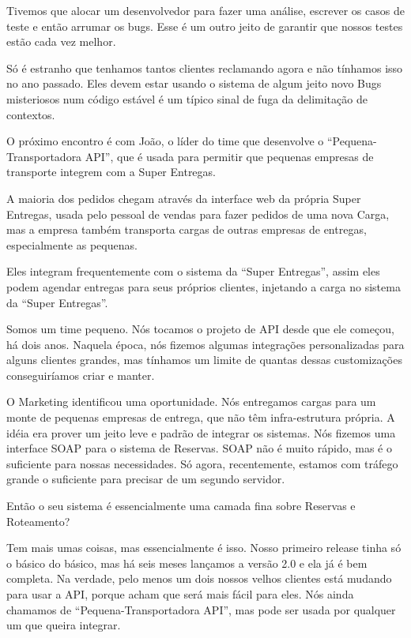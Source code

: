\documentclass[12pt,play]{article}
\begin{document}
Tivemos que alocar um desenvolvedor para fazer uma análise, escrever os casos de teste e então arrumar os bugs. Esse é um outro jeito de garantir que nossos testes estão cada vez melhor.

Só é estranho que tenhamos tantos clientes reclamando agora e não tínhamos isso no ano passado. Eles devem estar usando o sistema de algum jeito novo
\narr Bugs misteriosos num código estável é um típico sinal de fuga da delimitação de contextos.

\scene
\narr O próximo encontro é com João, o líder do time que desenvolve o ``Pequena-Transportadora API'', que é usada para permitir que pequenas empresas de transporte integrem com a Super Entregas.

A maioria dos pedidos chegam através da interface web da própria Super Entregas, usada pelo pessoal de vendas para fazer pedidos de uma nova Carga, mas a empresa também transporta cargas de outras empresas de entregas, especialmente as pequenas.

Eles integram frequentemente com o sistema da ``Super Entregas'', assim eles podem agendar entregas para seus próprios clientes, injetando a carga no sistema da ``Super Entregas''.

\joao Somos um time pequeno. Nós tocamos o projeto de API desde que ele começou, há dois anos. Naquela época, nós fizemos algumas integrações personalizadas para alguns clientes grandes, mas tínhamos um limite de quantas dessas customizações conseguiríamos criar e manter.

O Marketing identificou uma oportunidade. Nós entregamos cargas para um monte de pequenas empresas de entrega, que não têm infra-estrutura própria. A idéia era prover um jeito leve e padrão de integrar os sistemas. Nós fizemos uma interface SOAP para o sistema de Reservas. SOAP não é muito rápido, mas é o suficiente para nossas necessidades. Só agora, recentemente, estamos com tráfego grande o suficiente para precisar de um segundo servidor.

\dani Então o seu sistema é essencialmente uma camada fina sobre Reservas e Roteamento?

\joao Tem mais umas coisas, mas essencialmente é isso. Nosso primeiro release tinha só o básico do básico, mas há seis meses lançamos a versão 2.0 e ela já é bem completa. Na verdade, pelo menos um dois nossos velhos clientes está mudando para usar a API, porque acham que será mais fácil para eles. Nós ainda chamamos de ``Pequena-Transportadora API'', mas pode ser usada por qualquer um que queira integrar.
\end{document}
